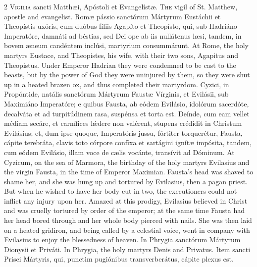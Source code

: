 \begin{paracol}{2}
\lettrine[lines=1]{V}{igília} sancti Matthæi, Apóstoli et Evangelístæ.
\switchcolumn
{}
\lettrine[lines=1]{T}{he} vigil of St. Matthew, apostle and evangelist.
\switchcolumn*
{}
Romæ pássio sanctórum 
 Mártyrum Eustáchii et Theopístis uxóris, cum duóbus fíliis Agapíto et 
 Theopísto, qui, sub Hadriáno Imperatóre, damnáti ad béstias, sed Dei ope ab 
 iis nullátenus læsi, tandem, in bovem æneum candéntem inclúsi, martyrium 
 consummárunt.
\switchcolumn
{}
At Rome, the holy martyrs Eustace, 
 and Theopistes, his wife, with their two sons, Agapitus and Theopistus. 
 Under Emperor Hadrian they were condemned to be cast to the beasts, but by 
 the power of God they were uninjured by them, so they were shut up in a 
 heated brazen ox, and thus completed their martyrdom.
\switchcolumn*
{}
Cyzici, in Propóntide, 
 natális sanctórum Mártyrum Faustæ Vírginis, et Evilásii, sub Maximiáno 
 Imperatóre; e quibus Fausta, ab eódem Evilásio, idolórum sacerdóte, 
 decalváta et ad turpitúdinem rasa, suspénsa et torta est. Deínde, cum 
 eam vellet médiam secáre, et carnífices lǽdere non valérent, stupens 
 crédidit in Christum Evilásius; et, dum ipse quoque, Imperatóris jussu, 
 fórtiter torquerétur, Fausta, cápite terebráta, clavis toto córpore confíxa 
 et sartágini ignítæ impósita, tandem, cum eódem Evilásio, illam voce de 
 cælis vocánte, transívit ad Dóminum.
\switchcolumn
{}
At Cyzicum, on the sea of Marmora, 
 the birthday of the holy martyrs Evilasius and the virgin Fausta, in the 
 time of Emperor Maximian. Fausta's head was shaved to shame her, and 
 she was hung up and tortured by Evilasius, then a pagan priest. But 
 when he wished to have her body cut in two, the executioners could not 
 inflict any injury upon her. Amazed at this prodigy, Evilasius 
 believed in Christ and was cruelly tortured by order of the emperor; at the 
 same time Fausta had her head bored through and her whole body pierced with 
 nails. She was then laid on a heated gridiron, and being called by a 
 celestial voice, went in company with Evilasius to enjoy the blessedness of 
 heaven.
\switchcolumn*
{}
In Phrygia sanctórum 
 Mártyrum Dionysii et Priváti.
\switchcolumn
{}
In Phrygia, the holy martyrs Denis 
 and Privatus.
\switchcolumn*
{}
Item sancti Prisci 
 Mártyris, qui, punctim pugiónibus transverberátus, cápite plexus est.
\switchcolumn
{}

\end{paracol}
